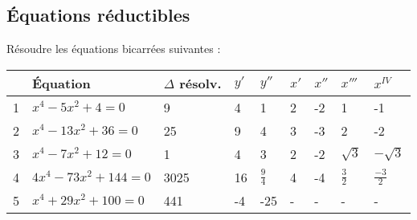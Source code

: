 \begin{landscape}
\subsection{\'Equations réductibles}

\begin{solution}
Résoudre les équations bicarrées suivantes :

\begin{tabular}{|l|l|l|l|l|l|l|l|l|}
\hline
   & Équation                                                                      & $\Delta $ résolv.                             & ${y}'$                                                           & ${y}''$                       & ${x}'$                & ${x}''$                & ${x}'''$              & ${{x}^{IV}}$           \\ \hline
1  & ${{x}^{4}}-5{{x}^{2}}+4=0$                                                    & 9                                             & 4                                                                & 1                             & 2                     & -2                     & 1                     & -1                     \\ \hline
2  & ${{x}^{4}}-13x{}^{2}+36=0$                                                    & 25                                            & 9                                                                & 4                             & 3                     & -3                     & 2                     & -2                     \\ \hline
3  & ${{x}^{4}}-7{{x}^{2}}+12=0$                                                   & 1                                             & 4                                                                & 3                             & 2                     & -2                     & $\sqrt{3}$            & $-\sqrt{3}$            \\ \hline
4  & $4{{x}^{4}}-73{{x}^{2}}+144=0$                                                & 3025                                          & 16                                                               & $\frac{9}{4}$                 & 4                     & -4                     & $\frac{3}{2}$         & $\frac{-3}{2}$         \\ \hline
5  & ${{x}^{4}}+29{{x}^{2}}+100=0$                                                 & 441                                           & -4                                                               & -25                           & -                     & -                      & -                     & -                      \\ \hline

\end{tabular}
\end{solution}
\end{landscape}
